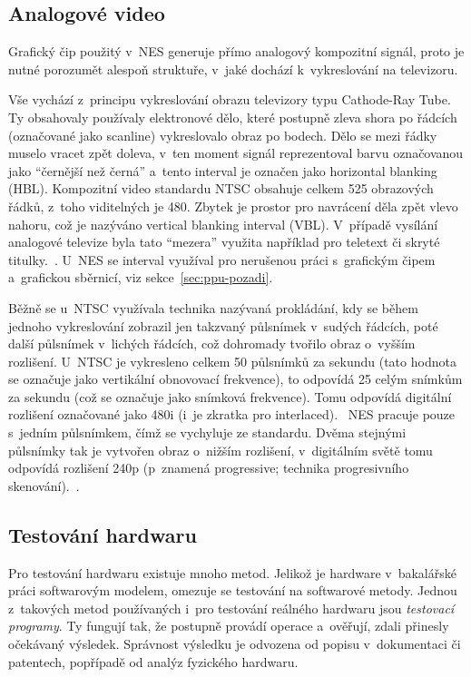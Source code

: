 \subsection{Analogové video}
\label{sec:analogove-video}
Grafický čip použitý v~NES generuje přímo analogový kompozitní signál, proto je nutné porozumět alespoň struktuře, v~jaké dochází k~vykreslování na televizoru.

Vše vychází z~principu vykreslování obrazu televizory typu Cathode-Ray Tube. Ty obsahovaly používaly elektronové dělo, které postupně zleva shora po řádcích (označované jako scanline) vykreslovalo obraz po bodech. Dělo se mezi řádky muselo vracet zpět doleva, v~ten moment signál reprezentoval barvu označovanou jako \enquote{černější než černá} a~tento interval je označen jako horizontal blanking (HBL). Kompozitní video standardu NTSC obsahuje celkem 525 obrazových řádků, z~toho viditelných je 480. Zbytek je prostor pro navrácení děla zpět vlevo nahoru, což je nazýváno vertical blanking interval (VBL). V~případě vysílání analogové televize byla tato \enquote{mezera} využita například pro teletext či skryté titulky.~\cite{Poynton2012:video}. U~NES se interval využíval pro nerušenou práci s~grafickým čipem a~grafickou sběrnicí, viz sekce~\ref{sec:ppu-pozadi}.

\begin{note}
Běžně se u~NTSC využívala technika nazývaná prokládání, kdy se během jednoho vykreslování zobrazil jen takzvaný půlsnímek v~sudých řádcích, poté další půlsnímek v~lichých řádcích, což dohromady tvořilo obraz o~vyšším rozlišení. U~NTSC je vykresleno celkem 50 půlsnímků za sekundu (tato hodnota se označuje jako vertikální obnovovací frekvence), to odpovídá 25 celým snímkům za sekundu (což se označuje jako snímková frekvence). Tomu odpovídá digitální rozlišení označované jako 480i (i~je zkratka pro interlaced).~\cite{Poynton2012:video} NES pracuje pouze s~jedním půlsnímkem, čímž se vychyluje ze standardu. Dvěma stejnými půlsnímky tak je vytvořen obraz o~nižším rozlišení, v~digitálním světě tomu odpovídá rozlišení 240p (p~znamená progressive; technika progresivního skenování).~\cite{Nesdev:ntsc}.
\end{note}

\subsection{Testování hardwaru}
Pro testování hardwaru existuje mnoho metod. Jelikož je hardware v~bakalářské práci softwarovým modelem, omezuje se testování na softwarové metody. Jednou z~takových metod používaných i~pro testování reálného hardwaru jsou \emph{testovací programy}. Ty fungují tak, že postupně provádí operace a~ověřují, zdali přinesly očekávaný výsledek. Správnost výsledku je odvozena od popisu v~dokumentaci či patentech, popřípadě od analýz fyzického hardwaru.

